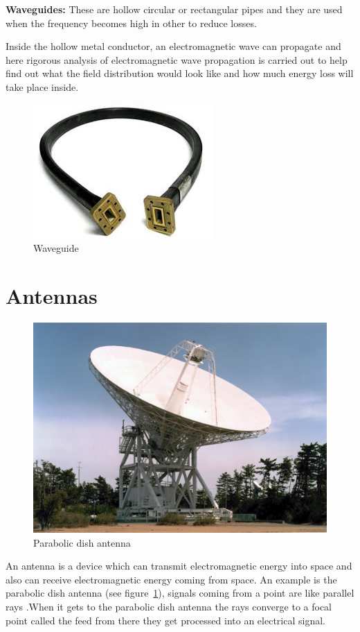 \textbf{Waveguides:} These are hollow circular or rectangular pipes and they are used when the frequency becomes high in other to reduce losses. 

Inside the hollow metal conductor, an electromagnetic wave can propagate and here rigorous analysis of electromagnetic wave propagation is carried out to help find out what the field distribution would look like and how much energy loss will take place inside.
\begin{figure}[h]
\centering
\includegraphics[scale=0.4]{./graphics/waveguide2}
\caption{Waveguide}
\end{figure}

\section{Antennas}
\begin{figure}[h]
\centering
\includegraphics[scale=0.4]{./graphics/spcaceantenna}
\caption{Parabolic dish antenna}
\label{fig:spaceantenna}
\end{figure}

An antenna is a device which can transmit electromagnetic energy into space and also can receive electromagnetic energy coming from space. An example is the parabolic dish antenna (see figure~\ref{fig:spaceantenna}), signals coming from a point are like parallel rays .When it gets to the parabolic dish antenna the rays converge to a focal point called the feed from there they get processed into an electrical signal.

